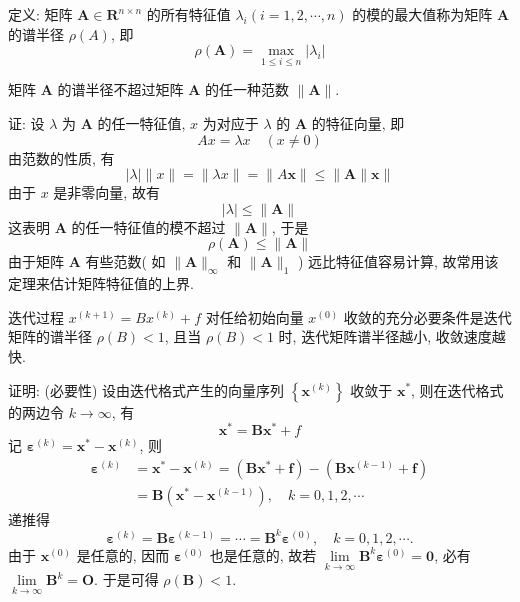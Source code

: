 定义: 矩阵 $ \boldsymbol{A} \in \mathbf{R}^{n \times n} $ 的所有特征值 $ \lambda_{i}(i=1,2, \cdots, n) $ 的模的最大值称为矩阵 $ \boldsymbol{A} $ 的谱半径 $ \rho(A) $, 即
$$
\rho(\boldsymbol{A})=\max _{1 \leqslant i \leqslant n}\left|\lambda_{i}\right|
$$
\begin{tcolorbox}[enhanced,colback=2,colframe=1,breakable,coltitle=black,title=定理]
 矩阵 $ \boldsymbol{A} $ 的谱半径不超过矩阵 $ \boldsymbol{A} $ 的任一种范数 $ \|\boldsymbol{A}\|$.
 \end{tcolorbox}
证: 设 $ \lambda $ 为 $ \boldsymbol{A} $ 的任一特征值, $ x $ 为对应于 $ \lambda $ 的 $ \boldsymbol{A} $ 的特征向量, 即
$$
A x=\lambda x \quad(x \neq 0)
$$
由范数的性质, 有
$$
|\lambda|\|x\|=\|\lambda x\|=\|A \boldsymbol{x}\| \leqslant\|\boldsymbol{A}\| \boldsymbol{x} \|
$$
由于 $ x $ 是非零向量, 故有
$$
|\lambda| \leqslant\|\boldsymbol{A}\|
$$
这表明 $ \boldsymbol{A} $ 的任一特征值的模不超过 $ \|\boldsymbol{A}\| $, 于是
$$
\rho(\boldsymbol{A}) \leqslant\|\boldsymbol{A}\|
$$
由于矩阵 $ \boldsymbol{A} $ 有些范数( 如 $ \|\boldsymbol{A}\|_{\infty} $ 和 $ \|\boldsymbol{A}\|_{1} $ ) 远比特征值容易计算, 故常用该定理来估计矩阵特征值的上界.
\begin{tcolorbox}[enhanced,colback=2,colframe=1,breakable,coltitle=black,title=迭代法收敛基本定理]
迭代过程 $ x^{(k+1)}=B x^{(k)}+f $ 对任给初始向量 $ x^{(0)} $ 收敛的充分必要条件是迭代矩阵的谱半径 $ \rho(B)<1 $, 且当 $ \rho(B)<1 $ 时, 迭代矩阵谱半径越小, 收敛速度越快.
\end{tcolorbox}
证明: (必要性) 设由迭代格式产生的向量序列 $ \left\{\boldsymbol{x}^{(k)}\right\} $ 收敛于 $ \boldsymbol{x}^{*} $, 则在迭代格式 的两边令 $ k \rightarrow \infty $, 有
$$
\boldsymbol{x}^{*}=\boldsymbol{B} \boldsymbol{x}^{*}+f
$$
记 $ \boldsymbol{\varepsilon}^{(k)}=\boldsymbol{x}^{*}-\boldsymbol{x}^{(k)} $, 则
$$
\begin{aligned}
\boldsymbol{\varepsilon}^{(k)} & =\boldsymbol{x}^{*}-\boldsymbol{x}^{(k)}=\left(\boldsymbol{B} \boldsymbol{x}^{*}+\boldsymbol{f}\right)-\left(\boldsymbol{B} \boldsymbol{x}^{(k-1)}+\boldsymbol{f}\right) \\
& =\boldsymbol{B}\left(\boldsymbol{x}^{*}-\boldsymbol{x}^{(k-1)}\right), \quad k=0,1,2, \cdots
\end{aligned}
$$
递推得
$$
\boldsymbol{\varepsilon}^{(k)}=\boldsymbol{B} \boldsymbol{\varepsilon}^{(k-1)}=\cdots=\boldsymbol{B}^{k} \boldsymbol{\varepsilon}^{(0)}, \quad k=0,1,2, \cdots .
$$
由于 $ \boldsymbol{x}^{(0)} $ 是任意的, 因而 $ \boldsymbol{\varepsilon}^{(0)} $ 也是任意的, 故若 $ \lim\limits _{k \rightarrow \infty} \boldsymbol{B}^{k} \boldsymbol{\varepsilon}^{(0)}=\mathbf{0} $, 必有 $ \lim\limits _{k \rightarrow \infty} \boldsymbol{B}^{k}=\boldsymbol{O} $. 于是可得 $ \rho(\boldsymbol{B})<1 $.

